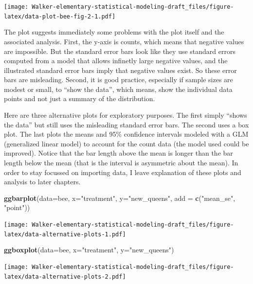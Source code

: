 \documentclass[]{book}
\newenvironment{Shaded}{\begin{snugshade}}{\end{snugshade}}
\newcommand{\KeywordTok}[1]{\textcolor[rgb]{0.13,0.29,0.53}{\textbf{#1}}}
\newcommand{\DataTypeTok}[1]{\textcolor[rgb]{0.13,0.29,0.53}{#1}}
\newcommand{\StringTok}[1]{\textcolor[rgb]{0.31,0.60,0.02}{#1}}
\newcommand{\NormalTok}[1]{#1}
\begin{document}
\texttt{[image: Walker-elementary-statistical-modeling-draft\_files/figure-latex/data-plot-bee-fig-2-1.pdf]}

The plot suggests immediately some problems with the plot itself and the
associated analysis. First, the y-axis is counts, which means that
negative values are impossible. But the standard error bars look like
they use standard errors computed from a model that allows infinetly
large negative values, and the illustrated standard error bars imply
that negative values exist. So these error bars are misleading. Second,
it is good practice, especially if sample sizes are modest or small, to
``show the data'', which means, show the individual data points and not
just a summary of the distribution.

Here are three alternative plots for exploratory purposes. The first
simply ``shows the data'' but still uses the misleading standard error
bars. The second uses a box plot. The last plots the means and 95\%
confidence intervals modeled with a GLM (generalized linear model) to
account for the count data (the model used could be improved). Notice
that the bar length above the mean is longer than the bar length below
the mean (that is the interval is asymmetric about the mean). In order
to stay focussed on importing data, I leave explanation of these plots
and analysis to later chapters.

\begin{Shaded}
\begin{Highlighting}[]
\KeywordTok{ggbarplot}\NormalTok{(}\DataTypeTok{data=}\NormalTok{bee, }\DataTypeTok{x=}\StringTok{"treatment"}\NormalTok{, }\DataTypeTok{y=}\StringTok{"new_queens"}\NormalTok{, }\DataTypeTok{add =} \KeywordTok{c}\NormalTok{(}\StringTok{"mean_se"}\NormalTok{, }\StringTok{"point"}\NormalTok{))}
\end{Highlighting}
\end{Shaded}

\texttt{[image: Walker-elementary-statistical-modeling-draft\_files/figure-latex/data-alternative-plots-1.pdf]}

\begin{Shaded}
\begin{Highlighting}[]
\KeywordTok{ggboxplot}\NormalTok{(}\DataTypeTok{data=}\NormalTok{bee, }\DataTypeTok{x=}\StringTok{"treatment"}\NormalTok{, }\DataTypeTok{y=}\StringTok{"new_queens"}\NormalTok{)}
\end{Highlighting}
\end{Shaded}

\texttt{[image: Walker-elementary-statistical-modeling-draft\_files/figure-latex/data-alternative-plots-2.pdf]}
\end{document}
